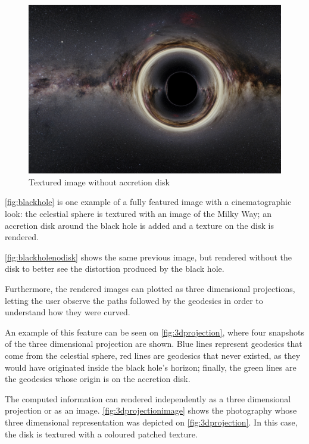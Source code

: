 \begin{figure}[bth]
	\myfloatalign
	\includegraphics[width=\linewidth]{gfx/bh_texture_nodisk}
	\caption[Textured image without accretion disk]{Textured image without accretion disk}
	\label{fig:blackholenodisk}
\end{figure}

\autoref{fig:blackhole} is one example of a fully featured image with a cinematographic look: the celestial sphere is textured with an image of the Milky Way; an accretion disk around the black hole is added and a texture on the disk is rendered.

\autoref{fig:blackholenodisk} shows the same previous image, but rendered without the disk to better see the distortion produced by the black hole.

Furthermore, the rendered images can plotted as three dimensional projections, letting the user observe the paths followed by the geodesics in order to understand how they were curved.

An example of this feature can be seen on \autoref{fig:3dprojection}, where four snapshots of the three dimensional projection are shown. Blue lines represent geodesics that come from the celestial sphere, red lines are geodesics that never existed, as they would have originated inside the black hole's horizon; finally, the green lines are the geodesics whose origin is on the accretion disk.

The computed information can rendered independently as a three dimensional projection or as an image. \autoref{fig:3dprojectionimage} shows the photography whose three dimensional representation was depicted on \autoref{fig:3dprojection}. In this case, the disk is textured with a coloured patched texture.

